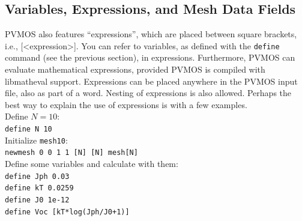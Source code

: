 \documentclass[noshowpacs,preprintnumbers,amsmath,amssymb, letter]{revtex4}
\begin{document}
\subsection{\label{expressions}Variables, Expressions, and Mesh Data Fields}
PVMOS also features ``expressions'', which are placed between square brackets, i.e., [\textless expression\textgreater]. You can refer to variables, as defined with the \texttt{define} command (see the previous section), in expressions. Furthermore, PVMOS can evaluate mathematical expressions, provided PVMOS is compiled with libmatheval support. Expressions can be placed anywhere in the PVMOS input file, also as part of a word. Nesting of expressions is also allowed. Perhaps the best way to explain the use of expressions is with a few examples.\\
Define $N=10$:\\
\texttt{define N 10} \\
Initialize \texttt{mesh10}:\\
\texttt{newmesh 0 0 1 1 [N] [N] mesh[N]}\\
Define some variables and calculate with them:\\
\texttt{define Jph 0.03} \\
\texttt{define kT 0.0259} \\
\texttt{define J0 1e-12} \\
\texttt{define Voc [kT*log(Jph/J0+1)]} \\
\end{document}
